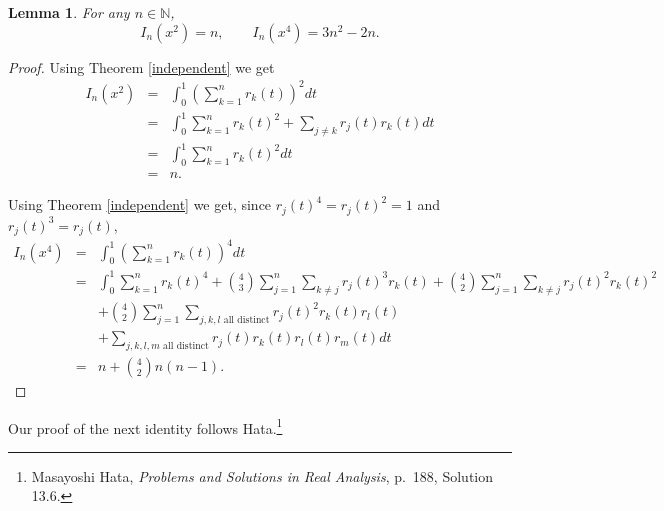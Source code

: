 \documentclass{article}
\newtheorem{lemma}[theorem]{Lemma}
\theoremstyle{definition}
\begin{document}
\begin{lemma}
For any $n \in \mathbb{N}$,
\[
I_n(x^2)=n, \qquad I_n(x^4)=3n^2-2n.
\]
\end{lemma}
\begin{proof}
Using Theorem \ref{independent} we get
\begin{eqnarray*}
I_n(x^2)&=&\int_0^1 \left(\sum_{k=1}^n r_k(t) \right)^2 dt\\
&=&\int_0^1 \sum_{k=1}^n r_k(t)^2 + \sum_{j \neq k} r_j(t) r_k(t) dt\\
&=&\int_0^1 \sum_{k=1}^n r_k(t)^2 dt\\
&=&n.
\end{eqnarray*}

Using Theorem \ref{independent} we get, since $r_j(t)^4=r_j(t)^2=1$ and $r_j(t)^3=r_j(t)$,
\begin{eqnarray*}
I_n(x^4)&=&\int_0^1 \left(\sum_{k=1}^n r_k(t) \right)^4 dt\\
&=&\int_0^1 \sum_{k=1}^n r_k(t)^4 +\binom{4}{3} \sum_{j=1}^n \sum_{k \neq j} r_j(t)^3 r_k(t)+
\binom{4}{2} \sum_{j=1}^n \sum_{k \neq j} r_j(t)^2 r_k(t)^2\\
&&+\binom{4}{2}\sum_{j=1}^n \sum_{\textrm{$j,k,l$ all distinct}} r_j(t)^2 r_k(t) r_l(t)\\
&&+\sum_{\textrm{$j,k,l,m$ all distinct}} r_j(t) r_k(t) r_l(t) r_m(t) dt\\
&=& n+\binom{4}{2}n(n-1).
\end{eqnarray*}
\end{proof}


Our proof of the next identity follows Hata.\footnote{Masayoshi Hata, {\em Problems and Solutions in Real Analysis}, p.~188, Solution 13.6.}
\end{document}
